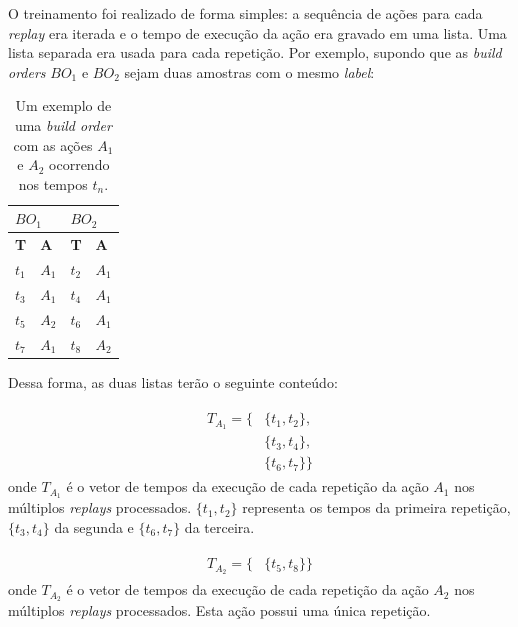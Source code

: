 O treinamento foi realizado de forma simples: a sequência de ações para cada \textit{replay} era iterada e o tempo de execução da ação era gravado em uma lista. Uma lista separada era usada para cada repetição. Por exemplo, supondo que as \textit{build orders} $BO_1$ e $BO_2$ sejam duas amostras com o mesmo \textit{label}:

\begin{table}[H]
\centering
\caption{Um exemplo de uma \textit{build order} com as ações $A_1$ e $A_2$ ocorrendo nos tempos $t_n$.}
\label{my-label}
\begin{tabular}{|l|l||l|l|}
\hline
\multicolumn{2}{|l||}{\centering $BO_1$} & \multicolumn{2}{l|}{\centering $BO_2$} \\ \hline
\textbf{T}  & \textbf{A}  & \textbf{T}  & \textbf{A} \\ \hline
$t_1$       & $A_1$       & $t_2$       & $A_1$      \\ \hline
$t_3$       & $A_1$       & $t_4$       & $A_1$      \\ \hline
$t_5$       & $A_2$       & $t_6$       & $A_1$      \\ \hline
$t_7$       & $A_1$       & $t_8$       & $A_2$      \\ \hline
\end{tabular}
\end{table}

Dessa forma, as duas listas terão o seguinte conteúdo:

\begin{align}
\begin{split}
    T_{A_1} = \{
		&\{t_1, t_2\}, 		\\
		&\{t_3, t_4\}, 		\\
		&\{t_6, t_7\}
	\}
\end{split}
\label{eq:metodo-exemplo-vetor-tempos-a1}
\end{align}
\noindent onde $T_{A_1}$ é o vetor de tempos da execução de cada repetição da ação $A_1$ nos múltiplos \textit{replays} processados. $\{t_1, t_2\}$ representa os tempos da primeira repetição, $\{t_3, t_4\}$ da segunda e $\{t_6, t_7\}$ da terceira.

\begin{align}
\begin{split}
    T_{A_2} = \{
		&\{t_5, t_8\}
	\}
\end{split}
\label{eq:metodo-exemplo-vetor-tempos-a2}
\end{align}
\noindent onde $T_{A_2}$ é o vetor de tempos da execução de cada repetição da ação $A_2$ nos múltiplos \textit{replays} processados. Esta ação possui uma única repetição.

